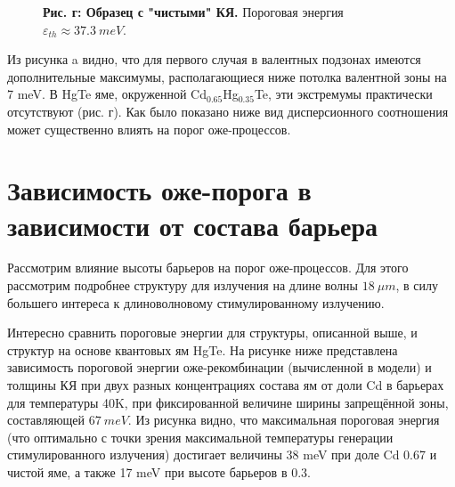 \documentclass[../main.tex]{subfiles}
\begin{document}
\begin{figure}[h!]
\begin{minipage}[h]{0.49\linewidth}
\begin{center}
                    \textbf{Рис. г: Образец с "чистыми" КЯ.} Пороговая энергия 
                        $\varepsilon_{th} \approx 37.3~meV$.
                \end{center}
            \end{minipage}
        \end{figure}

        Из рисунка a видно, что для первого случая в валентных подзонах имеются дополнительные максимумы, располагающиеся ниже потолка валентной 
        зоны на 7 meV. В HgTe яме, окруженной Cd${}_{0.65}$Hg${}_{0.35}$Te, эти экстремумы практически отсутствуют (рис. г). Как было показано ниже
        вид дисперсионного соотношения может существенно влиять на порог оже-процессов.
        \newpage

        \section{Зависимость оже-порога в зависимости от состава барьера}

        Рассмотрим влияние высоты барьеров на порог оже-процессов. Для 
        этого рассмотрим подробнее структуру для излучения на длине волны $18~\mu m$,
        в силу большего интереса к длиноволновому стимулированному излучению.

        Интересно сравнить пороговые энергии для структуры, описанной выше, и структур на основе квантовых ям HgTe. На рисунке ниже представлена 
        зависимость пороговой энергии оже-рекомбинации (вычисленной в модели) и толщины КЯ при двух разных концентрациях состава ям
        от доли Cd в барьерах для температуры 40K, 
        при фиксированной величине ширины запрещённой зоны, составляющей $67~meV$. Из рисунка видно, что максимальная пороговая энергия (что оптимально 
        с точки зрения максимальной температуры генерации стимулированного излучения) достигает величины 38 meV при доле Cd 0.67 и чистой яме, а также 
        17 meV при высоте барьеров в 0.3.
\end{document}
